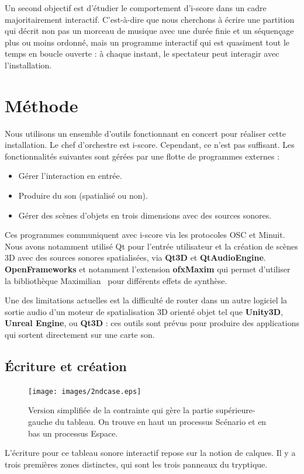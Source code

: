 \documentclass{article}
\begin{document}
    Un second objectif est d'étudier le comportement d'i-score dans un cadre majoritairement interactif.
    C'est-à-dire que nous cherchons à écrire une partition qui décrit non pas un morceau de musique avec une durée finie et un séquençage plus ou moins ordonné, mais un programme interactif qui est quasiment tout le temps en boucle ouverte : à chaque instant, le spectateur peut interagir avec l'installation. 
    
    \section*{Méthode}
    Nous utilisons un ensemble d'outils fonctionnant en concert pour réaliser cette installation.
    Le chef d'orchestre est i-score.
    Cependant, ce n'est pas suffisant.
    Les fonctionnalités suivantes sont gérées par une flotte de programmes externes : 
    \begin{itemize}
        \item Gérer l'interaction en entrée.
        \item Produire du son (spatialisé ou non).
        \item Gérer des scènes d'objets en trois dimensions avec des sources sonores.
    \end{itemize}
    
    Ces programmes communiquent avec i-score via les protocoles OSC et Minuit.
    Nous avons notamment utilisé Qt pour l'entrée utilisateur et la création de scènes 3D avec des sources sonores spatialisées, via \textbf{Qt3D} et \textbf{QtAudioEngine}.
    \textbf{OpenFrameworks} et notamment l'extension \textbf{ofxMaxim} qui permet d'utiliser la bibliothèque Maximilian~\cite{grierson2010maximilian} pour différents effets de synthèse.
    
    Une des limitations actuelles est la difficulté de router dans un autre logiciel la sortie audio d'un moteur de spatialisation 3D orienté objet tel que \textbf{Unity3D}, \textbf{Unreal Engine}, ou \textbf{Qt3D} : ces outils sont prévus pour produire des applications qui sortent directement sur une carte son.
    
    \subsection*{Écriture et création}
    \begin{figure}[h]
        \centering
        
        \texttt{[image: images/2ndcase.eps]}
        \caption{Version simplifiée de la contrainte qui gère la partie supérieure-gauche du tableau. On trouve en haut un processus Scénario et en bas un processus Espace.}
        \label{fig.2ndcase}
    \end{figure}
    L'écriture pour ce tableau sonore interactif repose sur la notion de calques.
    Il y a trois premières zones distinctes, qui sont les trois panneaux du tryptique.
    
\end{document}
